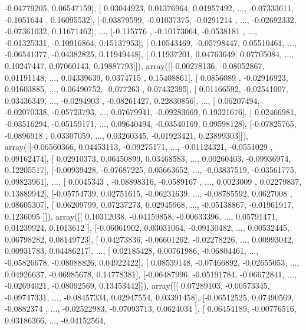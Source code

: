 \documentclass{article}
\begin{document}
        -0.04779205,  0.06547159],
       [ 0.03044923,  0.01376964,  0.01957492, ..., -0.07333611,
        -0.1051644 ,  0.16095532],
       [-0.03879599, -0.01037375, -0.0291214 , ..., -0.02692332,
        -0.07361032,  0.11671462],
       ..., 
       [-0.115776  , -0.10173064, -0.0538181 , ..., -0.01325331,
        -0.10916864,  0.15137953],
       [ 0.10543469, -0.05798447,  0.05510461, ..., -0.06541377,
        -0.04382825,  0.11949448],
       [ 0.11937201,  0.04763649,  0.07705084, ...,  0.10247447,
         0.07060143,  0.19887793]]), array([[-0.00278136, -0.08052867,  0.01191148, ...,  0.04339639,
         0.0374715 ,  0.15408861],
       [ 0.0856089 , -0.02916923,  0.01603885, ...,  0.06490752,
        -0.077263  ,  0.07432395],
       [ 0.01166592, -0.02541007,  0.03436349, ..., -0.0294903 ,
        -0.08261427,  0.22830856],
       ..., 
       [ 0.06207494, -0.02070338, -0.05723793, ...,  0.07679941,
        -0.09283669,  0.19321676],
       [ 0.02466981, -0.03516294, -0.05159171, ...,  0.09640494,
        -0.03540169,  0.09598128],
       [-0.07825765, -0.0896918 ,  0.03307059, ...,  0.03260345,
        -0.01923421,  0.23899303]]), array([[-0.06560366,  0.04453113, -0.09275171, ..., -0.01124321,
        -0.0551029 ,  0.09162474],
       [ 0.02910373,  0.06450899,  0.03468583, ...,  0.00260403,
        -0.09936974,  0.12205517],
       [-0.00939428, -0.07687225,  0.05663652, ..., -0.03837519,
        -0.03561775,  0.09823961],
       ..., 
       [ 0.0045343 , -0.08898316, -0.0589167 , ...,  0.0023009 ,
         0.02279837,  0.13889942],
       [-0.05754739,  0.02751615, -0.06231639, ..., -0.08785592,
         0.0627008 ,  0.08605307],
       [ 0.06209799,  0.07237273,  0.02945968, ..., -0.05138867,
        -0.01961917,  0.1236095 ]]), array([[ 0.10312038, -0.04159858, -0.00633396, ...,  0.05791471,
         0.01239924,  0.1013612 ],
       [-0.06061902,  0.03031064, -0.09130482, ...,  0.00532445,
         0.06798282,  0.08149723],
       [ 0.04273836, -0.06601262, -0.02278226, ...,  0.00993042,
         0.00931783,  0.04486217],
       ..., 
       [ 0.02185428,  0.00761986, -0.06804461, ..., -0.05826678,
        -0.08088826,  0.04922422],
       [ 0.08539148, -0.07466892, -0.02655053, ...,  0.04926637,
        -0.06985678,  0.14778381],
       [-0.06487996, -0.05191784, -0.06672841, ..., -0.02694021,
        -0.08092569,  0.13453442]]), array([[ 0.07289103, -0.00573345, -0.09747331, ..., -0.08457334,
         0.02947554,  0.03391458],
       [-0.06512525,  0.07490569, -0.0882374 , ..., -0.02522983,
        -0.07093713,  0.0624034 ],
       [ 0.06454189, -0.00776516,  0.03186366, ..., -0.04152564,
\end{document}
